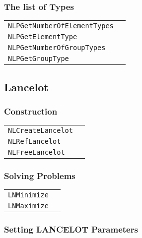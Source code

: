 \documentclass[12pt]{article}
\begin{document}
\subsubsection{The list of Types}

\begin{center}
\begin{tabular}{ll}
\tt NLPGetNumberOfElementTypes&\pageref{Subroutine:NLPGetNumberOfElementTypes}\\
\tt NLPGetElementType&\pageref{Subroutine:NLPGetElementType}\\
\tt NLPGetNumberOfGroupTypes&\pageref{Subroutine:NLPGetNumberOfGroupTypes}\\
\tt NLPGetGroupType&\pageref{Subroutine:NLPGetGroupType}\\
\end{tabular}
\end{center}

\subsection{Lancelot}

\subsubsection{Construction}
\begin{center}
\begin{tabular}{ll}
\tt NLCreateLancelot&\pageref{Subroutine:NLCreateLancelot}\\
\tt NLRefLancelot&\pageref{Subroutine:NLRefLancelot}\\
\tt NLFreeLancelot&\pageref{Subroutine:NLFreeLancelot}\\
\end{tabular}
\end{center}

\subsubsection{Solving Problems}

\begin{center}
\begin{tabular}{ll}
\tt LNMinimize&\pageref{Subroutine:LNMinimize}\\
\tt LNMaximize&\pageref{Subroutine:LNMaximize}\\
\end{tabular}
\end{center}

\subsubsection{Setting LANCELOT Parameters}
\end{document}

